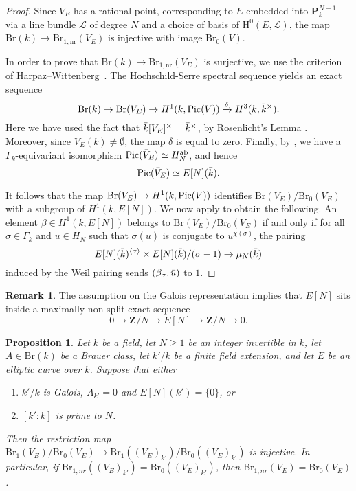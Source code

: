 \documentclass[10pt,letterpaper,twoside]{article}
\newcommand{\Lscr}{\mathcal{L}}
\renewcommand{\H}{\mathrm{H}}
\renewcommand{\1}{\mathbf{1}}
\newcommand{\bP}{\mathbf{P}}
\newcommand{\bZ}{\mathbf{Z}}
\newcommand{\nr}{\mathrm{nr}}
\renewcommand{\geq}{\geqslant}
\newcommand{\Pic}{\mathrm{Pic}}
\newcommand{\Br}{\mathrm{Br}}
\theoremstyle{plain}
\newtheorem{proposition}[theorem]{Proposition}
\theoremstyle{plain}
\theoremstyle{definition}
\theoremstyle{named}
\theoremstyle{definition}
\newtheorem{remark}[theorem]{Remark}
\begin{document}
	\begin{proof}
		Since $V_E$ has a rational point, corresponding to $E$ embedded into $\bP^{N-1}_k$
		via a line bundle $\Lscr$ of degree $N$ and a choice of basis of $\H^0(E,\Lscr)$, the map
		$\Br(k)\rightarrow\Br_{1,\nr}(V_E)$ is injective with image $\Br_0(V)$. 
		
		In order to prove that $\Br(k)\rightarrow\Br_{1,\nr}(V_E)$ is surjective, we use the criterion of
		Harpaz--Wittenberg~\cite{harpaz-wittenberg-massey}. The Hochschild-Serre spectral sequence yields an exact sequence
		\[\Br(k)\to \Br(V_E)\to H^1(k,\Pic(\Bar{V}))\xrightarrow{\delta}H^3(k,\Bar{k}^\times).\]
		Here we have used the fact that $\Bar{k}[V_E]^\times=\Bar{k}^\times$, by Rosenlicht's Lemma \cite{}. Moreover, since $V_E(k)\neq \emptyset$, the map $\delta$ is equal to zero. Finally, by \cite{}, we have a $\Gamma_k$-equivariant isomorphism $\Pic(\Bar{V}_E)\simeq H^{\mathrm{ab}}_N$, and hence
		\[\Pic(\Bar{V}_E)\simeq E[N](\Bar{k}).\]
		
		It follows that the map $\Br(V_E)\to H^1(k,\Pic(\Bar{V}))$ identifies $\Br(V_E)/\Br_0(V_E)$ with a subgroup of $H^1(k,E[N])$. We now apply \cite[Proposition 3.3]{harpaz-wittenberg-massey} to obtain the following. An element $\beta\in H^1(k,E[N])$ belongs to $\Br(V_E)/\Br_0(V_E)$ if and only if for all $\sigma\in \Gamma_k$ and $u\in H_N$ such that $\sigma(u)$ is conjugate to $u^{\chi(\sigma)}$, the pairing
		\[E[N](\Bar{k})^{\langle\sigma\rangle}\times E[N](\Bar{k})/(\sigma-1)\to \mu_N(\Bar{k})\]
		induced by the Weil pairing sends $(\beta_{\sigma},\Bar{u})$ to $1$. 
	\end{proof}
	
	\begin{remark}
		The assumption on the Galois representation implies that $E[N]$ sits inside a maximally non-split exact sequence
		$$0\rightarrow\bZ/N\rightarrow E[N]\rightarrow\bZ/N\rightarrow 0.$$
	\end{remark}
	
	
	
	\begin{proposition}
		Let $k$ be a field, let $N\geq 1$ be an integer invertible in $k$, let $A\in \Br(k)$ be a Brauer class, let $k'/k$ be a finite field extension, and let $E$ be an elliptic curve over $k$. Suppose that either
		\begin{enumerate}
			\item $k'/k$ is Galois, $A_{k'}=0$ and $E[N](k')=\{0\}$, or
			\item $[k':k]$ is prime to $N$.
		\end{enumerate}
		Then the restriction map $\Br_1(V_E)/\Br_0(V_E)\to \Br_1((V_E)_{k'})/\Br_0((V_E)_{k'})$ is injective. In particular, if $\Br_{1,nr}((V_E)_{k'})=\Br_0((V_E)_{k'})$, then $\Br_{1,nr}(V_E)=\Br_0(V_E)$.
	\end{proposition}
	
\end{document}
